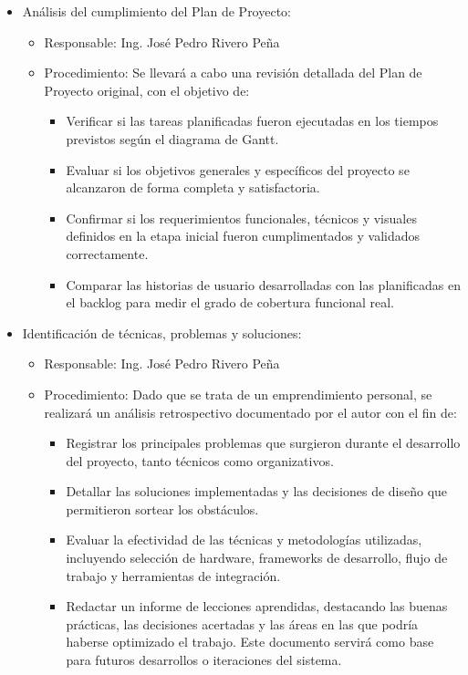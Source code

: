\documentclass[
11pt, %
]{charter}
\begin{document}
\begin{itemize}
	\item Análisis del cumplimiento del Plan de Proyecto:
	      \begin{itemize}
		      \item Responsable: Ing. José Pedro Rivero Peña
		      \item Procedimiento: Se llevará a cabo una revisión detallada del Plan de Proyecto original, con el objetivo de:
		            \begin{itemize}
			            \item Verificar si las tareas planificadas fueron ejecutadas en los tiempos previstos según el diagrama de Gantt.
			            \item Evaluar si los objetivos generales y específicos del proyecto se alcanzaron de forma completa y satisfactoria.
			            \item Confirmar si los requerimientos funcionales, técnicos y visuales definidos en la etapa inicial fueron cumplimentados y validados correctamente.
			            \item Comparar las historias de usuario desarrolladas con las planificadas en el backlog para medir el grado de cobertura funcional real.
		            \end{itemize}
	      \end{itemize}
	
	\item Identificación de técnicas, problemas y soluciones:
	      \begin{itemize}
		      \item Responsable: Ing. José Pedro Rivero Peña
		      \item Procedimiento: Dado que se trata de un emprendimiento personal, se realizará un análisis retrospectivo documentado por el autor con el fin de:
		            \begin{itemize}
			            \item Registrar los principales problemas que surgieron durante el desarrollo del proyecto, tanto técnicos como organizativos.
			            \item Detallar las soluciones implementadas y las decisiones de diseño que permitieron sortear los obstáculos.
			            \item Evaluar la efectividad de las técnicas y metodologías utilizadas, incluyendo selección de hardware, frameworks de desarrollo, flujo de trabajo y herramientas de integración.
			            \item Redactar un informe de lecciones aprendidas, destacando las buenas prácticas, las decisiones acertadas y las áreas en las que podría haberse optimizado el trabajo. Este documento servirá como base para futuros desarrollos o iteraciones del sistema.
		            \end{itemize}
	      \end{itemize}


\end{itemize}
\end{document}
